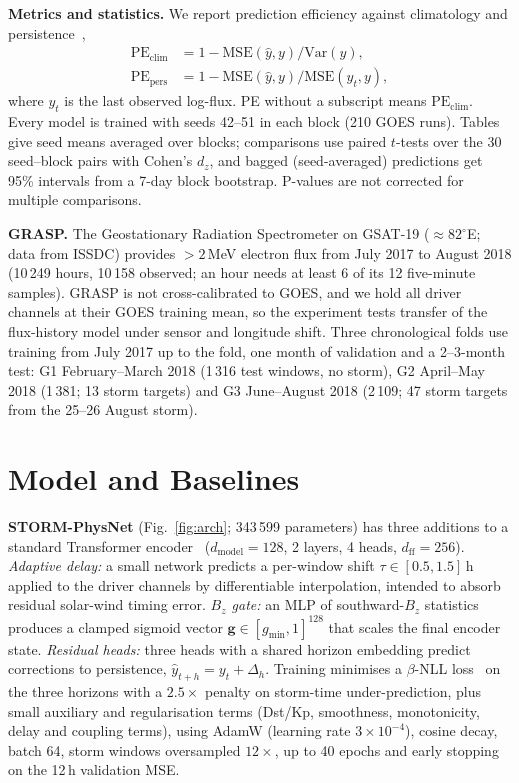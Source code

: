 \documentclass[conference,a4paper]{IEEEtran}
\begin{document}
\textbf{Metrics and statistics.} We report prediction efficiency against
climatology and persistence~\cite{morley2018},
\begin{align}
\mathrm{PE}_{\mathrm{clim}} &= 1 - \mathrm{MSE}(\hat y,y)/\mathrm{Var}(y), \\
\mathrm{PE}_{\mathrm{pers}} &= 1 - \mathrm{MSE}(\hat y,y)/\mathrm{MSE}(y_t,y),
\end{align}
where \(y_t\) is the last observed log-flux. PE without a subscript means
\(\mathrm{PE}_{\mathrm{clim}}\). Every model is trained with seeds 42--51 in
each block (210 GOES runs). Tables give seed means averaged over blocks;
comparisons use paired \(t\)-tests over the 30 seed--block pairs with
Cohen's \(d_z\), and bagged (seed-averaged) predictions get 95\% intervals
from a 7-day block bootstrap. P-values are not corrected for multiple comparisons.

\textbf{GRASP.} The Geostationary Radiation Spectrometer on GSAT-19
(\(\approx82^\circ\)E; data from ISSDC) provides \({>}2\)\,MeV electron flux from
July 2017 to August 2018 (10\,249 hours, 10\,158 observed; an hour needs at
least 6 of its 12 five-minute samples). GRASP is not cross-calibrated to
GOES, and we hold all driver channels at their GOES training mean, so the
experiment tests transfer of the flux-history model under sensor and longitude
shift. Three chronological folds use training from July 2017 up to the fold,
one month of validation and a 2--3-month test: G1 February--March 2018 (1\,316
test windows, no storm), G2 April--May 2018 (1\,381; 13 storm targets) and G3
June--August 2018 (2\,109; 47 storm targets from the 25--26 August storm).

\section{Model and Baselines}
\textbf{STORM-PhysNet} (Fig.~\ref{fig:arch}; 343\,599 parameters) has three
additions to a standard Transformer encoder~\cite{vaswani2017}
(\(d_{\mathrm{model}}=128\), 2 layers, 4 heads, \(d_{\mathrm{ff}}=256\)).
\emph{Adaptive delay:} a small network predicts a per-window shift
\(\tau\in[0.5,1.5]\)\,h applied to the driver channels by differentiable
interpolation, intended to absorb residual solar-wind timing error.
\emph{\(B_z\) gate:} an MLP of southward-\(B_z\) statistics produces a clamped
sigmoid vector \(\mathbf g\in[g_{\min},1]^{128}\) that scales the final encoder
state. \emph{Residual heads:} three heads with a shared horizon embedding
predict corrections to persistence, \(\hat y_{t+h}=y_t+\Delta_h\).
Training minimises a \(\beta\)-NLL loss~\cite{seitzer2022} on the three
horizons with a \(2.5\times\) penalty on storm-time under-prediction, plus small
auxiliary and regularisation terms (Dst/Kp, smoothness, monotonicity, delay and
coupling terms), using AdamW (learning rate \(3\times10^{-4}\)), cosine decay,
batch 64, storm windows oversampled \(12\times\), up to 40 epochs and early stopping on
the 12\,h validation MSE.
\end{document}
